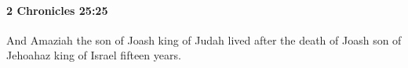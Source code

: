 
		\paragraph{2 Chronicles 25:25} %
			\label{2CHRONICLES-25-25}

			And Amaziah the son of Joash king of Judah lived after the death of Joash son of Jehoahaz king of Israel fifteen years.


